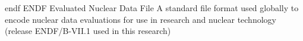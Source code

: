 \newglsXacronym%
{endf}%
{ENDF}%
{Evaluated Nuclear Data File}%
{A standard file format used globally to encode nuclear data evaluations for use in research and nuclear technology (release ENDF/B-VII.1 used in this research)}%